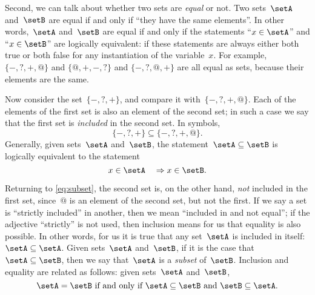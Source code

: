 Second, we can talk about whether two sets are \emph{equal} or not.
Two sets~$\setA$ and~$\setB$ are equal if and only if ``they have the same elements''.
In other words,~$\setA$ and~$\setB$ are equal if and only if the statements
``$x \in \setA$'' and  ``$x \in \setB$'' are logically equivalent: if these statements are always either both true or both false for any instantiation of the variable~$x$.
For example, $\{ -, ?, +, @ \}$ and $\{ @, +, -, ?\}$ and $\{ -, ?, @, + \}$ are all equal as sets, because their elements are the same.

Now consider the set~$\{ -, ?, + \}$, and compare it with~$\{ -, ?, +, @ \}$.
Each of the elements of the first set is also an element of the second set; in such a case we say that the first set is \emph{included} in the second set. In symbols,
\begin{equation}
  \label{eq:subset}
\{ -, ?, + \} \subseteq \{ -, ?, +, @ \}.
\end{equation}
Generally, given sets~$\setA$ and~$\setB$, the statement~$\setA \subseteq \setB$ is logically equivalent to the statement
\begin{equation}
x \in \setA \quad \Rightarrow  x \in \setB.
\end{equation}

Returning to \cref{eq:subset}, the second set is, on the other hand, \emph{not} included in the first set, since~$@$ is an element of the second set, but not the first.
If we say a set is ``strictly included'' in another, then we mean ``included in and not equal'';
if the adjective ``strictly'' is not used, then inclusion means for us that equality is also possible.
In other words, for us it is true that any set~$\setA$ is included in itself:~$\setA \subseteq \setA$.
Given sets~$\setA$ and~$\setB$, if it is the case that~$\setA \subseteq \setB$, then we say that~$\setA$ is a \emph{subset} of~$\setB$.
Inclusion and equality are related as follows: given sets~$\setA$ and~$\setB$,
\begin{equation}
\setA = \setB \text{ if and only if } \setA \subseteq \setB \text{ and } \setB \subseteq \setA.
\end{equation}

